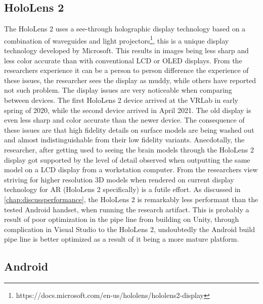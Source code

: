 \subsection{HoloLens 2}

The HoloLens 2 uses a see-through holographic display technology based on a combination of waveguides and light projectors\footnote{https://docs.microsoft.com/en-us/hololens/hololens2-display}, this is a unique display technology developed by Microsoft. This results in images being less sharp and less color accurate than with conventional LCD or OLED displays. From the researchers experience it can be a person to person difference the experience of these issues, the researcher sees the display as muddy, while others have reported not such problem. The display issues are very noticeable when comparing between devices. The first HoloLens 2 device arrived at the VRLab in early spring of 2020, while the second device arrived in April 2021. The old display is even less sharp and color accurate than the newer device.
The consequence of these issues are that high fidelity details on surface models are being washed out and almost indistinguishable from their low fidelity variants. Anecdotally, the researcher, after getting used to seeing the brain models through the HoloLens 2 display got supported by the level of detail observed when outputting the same model on a LCD display from a workstation computer. From the researchers view striving for higher resolution 3D models when rendered on current display technology for AR (HoloLens 2 specifically) is a futile effort.
As discussed in \autoref{chap:discussperformance}, the HoloLens 2 is remarkably less performant than the tested Android handset, when running the research artifact. This is probably a result of poor optimization in the pipe line from building on Unity, through complication in Visual Studio to the HoloLens 2, undoubtedly the Android build pipe line is better optimized as a result of it being a more mature platform.

\subsection{Android}

